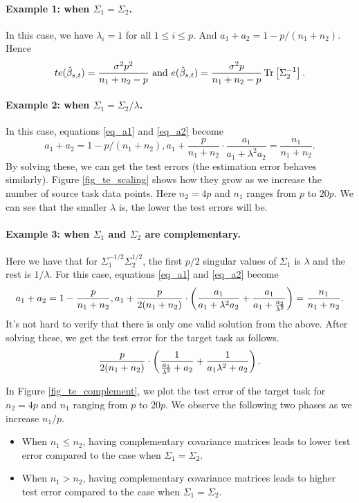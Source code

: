 \paragraph{Example 1: when $\Sigma_1 = \Sigma_2$.}
In this case, we have $\lambda_i = 1$ for all $1\le i\le p$.
And $a_1 + a_2 = 1 - p / (n_1 + n_2)$.
Hence
\[ te(\hat{\beta}_{s,t}) = \frac{\sigma^2 p^2}{n_1 + n_2 - p} \text{ and } e(\hat{\beta}_{s,t}) = \frac {\sigma^2 p} {n_1 + n_2 - p} \operatorname{Tr}\left[\Sigma_2^{-1}\right]. \]

\paragraph{Example 2: when $\Sigma_1 = \Sigma_2 / \lambda$.}
In this case, equations \eqref{eq_a1} and \eqref{eq_a2} become
\[ a_1 + a_2 = 1 - p/(n_1 + n_2), a_1 + \frac{p}{n_1 + n_2} \cdot \frac {a_1} {a_1 + \lambda^2 a_2} = \frac{n_1} {n_1 + n_2}. \]
By solving these, we can get the test errors (the estimation error behaves similarly).
Figure \ref{fig_te_scaling} shows how they grow as we increase the number of source task data points.
Here $n_2 = 4p$ and $n_1$ ranges from $p$ to $20p$.
We can see that the smaller $\lambda$ is, the lower the test errors will be.

\paragraph{Example 3: when $\Sigma_1$ and $\Sigma_2$ are complementary.}
Here we have that for $\Sigma_1^{-1/2}\Sigma_2^{1/2}$, the first $p/2$ singular values of $\Sigma_1$ is $\lambda$ and the rest is $1/\lambda$.
For this case, equations \eqref{eq_a1} and \eqref{eq_a2} become
\[ a_1 + a_2 = 1 - \frac{p}{n_1 + n_2}, a_1 + \frac{p}{2(n_1 + n_2)}\cdot \left({\frac{a_1}{a_1 + \lambda^2 a_2} + \frac{a_1}{a_1 + \frac{a_2}{\lambda^2}}}\right) = \frac{n_1}{n_1 + n_2}. \]
It's not hard to verify that there is only one valid solution from the above.
After solving these, we get the test error for the target task as follows.
\[ \frac{p}{2(n_1 + n_2)} \cdot \left({\frac{1}{\frac{a_1}{\lambda^2} + a_2} + \frac{1}{a_1\lambda^2 + a_2}}\right).\]

In Figure \ref{fig_te_complement}, we plot the test error of the target task for $n_2 = 4p$ and $n_1$ ranging from $p$ to $20p$.
We observe the following two phases as we increase $n_1 / p$.
\begin{itemize}
	\item When $n_1 \le n_2$, having complementary covariance matrices leads to lower test error compared to the case when $\Sigma_1 = \Sigma_2$.
	\item When $n_1 > n_2$, having complementary covariance matrices leads to higher test error compared to the case when $\Sigma_1 = \Sigma_2$.
\end{itemize}

